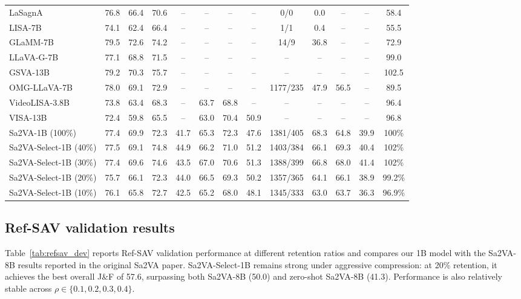 \begin{table}[t]
{\begin{tabular}{lcccccccccccc}
LaSagnA & 76.8 & 66.4 & 70.6 & -- & -- & -- & -- & 0/0 & 0.0 & -- & -- & 58.4 \\
LISA-7B & 74.1 & 62.4 & 66.4 & -- & -- & -- & -- & 1/1 & 0.4 & -- & -- & 55.5 \\
GLaMM-7B & 79.5 & 72.6 & 74.2 & -- & -- & -- & -- & 14/9 & 36.8 & -- & -- & 72.9 \\
LLaVA-G-7B & 77.1 & 68.8 & 71.5 & -- & -- & -- & -- & -- & -- & -- & -- & 99.0 \\
GSVA-13B & 79.2 & 70.3 & 75.7 & -- & -- & -- & -- & -- & -- & -- & -- & 102.5 \\
OMG-LLaVA-7B & 78.0 & 69.1 & 72.9 & -- & -- & -- & -- & 1177/235 & 47.9 & 56.5 & -- & 89.5 \\
VideoLISA-3.8B & 73.8 & 63.4 & 68.3 & -- & 63.7 & 68.8 & -- & -- & -- & -- & -- & 96.4 \\
VISA-13B & 72.4 & 59.8 & 65.5 & -- & 63.0 & 70.4 & 50.9 & -- & -- & -- & -- & 96.8 \\
\midrule
Sa2VA-1B (100\%) & 77.4 & 69.9 & 72.3 & 41.7 & 65.3 & 72.3 & 47.6 & 1381/405 & 68.3 & 64.8 & 39.9 & 100\% \\
\midrule
Sa2VA-Select-1B (40\%) & 77.5 & 69.1 & 74.8 & 44.9 & 66.2 & 71.0 & 51.2 & 1403/384 & 66.1 & 69.3 & 40.4 & 102\% \\
Sa2VA-Select-1B (30\%) & 77.4 & 69.6 & 74.6 & 43.5 & 67.0 & 70.6 & 51.3 & 1388/399 & 66.8 & 68.0 & 41.4 & 102\% \\
Sa2VA-Select-1B (20\%) & 75.7 & 66.1 & 72.3 & 44.0 & 66.5 & 69.3 & 50.2 & 1357/365 & 64.1 & 66.1 & 38.9 & 99.2\% \\
Sa2VA-Select-1B (10\%) & 76.1 & 65.8 & 72.7 & 42.5 & 65.2 & 68.0 & 48.1 & 1345/333 & 63.0 & 63.7 & 36.3 & 96.9\% \\
\bottomrule
\end{tabular}%
}
\end{table}

\subsection{Ref-SAV validation results}
\label{sec:exp_refsav}
Table~\ref{tab:refsav_dev} reports Ref-SAV validation performance at different retention ratios and compares our 1B model with the Sa2VA-8B results reported in the original Sa2VA paper.
Sa2VA-Select-1B remains strong under aggressive compression: at 20\% retention, it achieves the best overall J\&F of 57.6, surpassing both Sa2VA-8B (50.0) and zero-shot Sa2VA-8B (41.3).
Performance is also relatively stable across $\rho\in\{0.1,0.2,0.3,0.4\}$.

